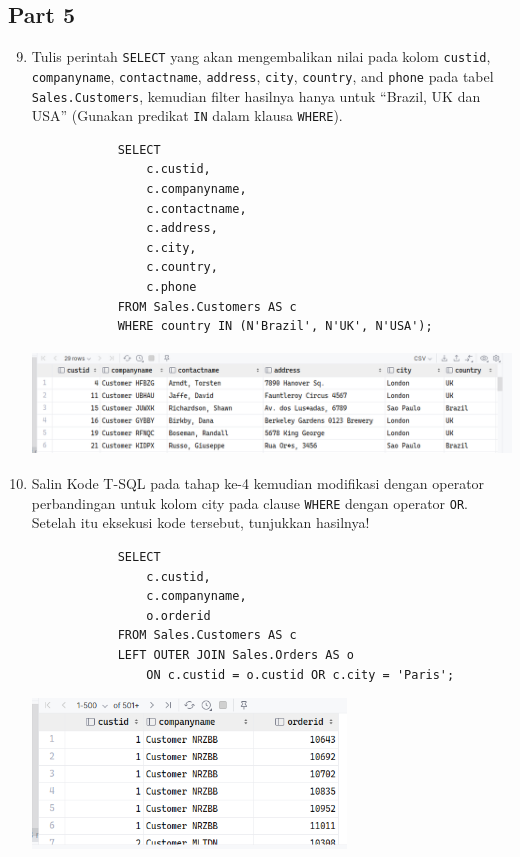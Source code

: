 \documentclass[12pt,titlepage]{article}
\begin{document}
\subsection{Part 5}
\begin{enumerate}
    \setcounter{enumi}{8}
    \item {
        Tulis perintah \texttt{SELECT} yang akan mengembalikan nilai pada kolom \texttt{custid}, \texttt{companyname},
        \texttt{contactname}, \texttt{address}, \texttt{city}, \texttt{country}, and \texttt{phone} pada tabel \texttt{Sales.Customers}, kemudian filter hasilnya
        hanya untuk ``Brazil, UK dan USA'' (Gunakan predikat \texttt{IN} dalam klausa \texttt{WHERE}).

        \begin{verbatim}
            SELECT
                c.custid,
                c.companyname,
                c.contactname,
                c.address,
                c.city,
                c.country,
                c.phone
            FROM Sales.Customers AS c
            WHERE country IN (N'Brazil', N'UK', N'USA');
        \end{verbatim}

        \begin{center}
            \includegraphics[height=2.8cm]{./images/p5-n1.png}
        \end{center}
    }
    \item {
        Salin Kode T-SQL pada tahap ke-4 kemudian modifikasi dengan operator perbandingan
        untuk kolom city pada clause \texttt{WHERE} dengan operator \texttt{OR}. Setelah itu eksekusi kode tersebut,
        tunjukkan hasilnya!

        \begin{verbatim}
            SELECT
                c.custid,
                c.companyname,
                o.orderid
            FROM Sales.Customers AS c
            LEFT OUTER JOIN Sales.Orders AS o 
                ON c.custid = o.custid OR c.city = 'Paris';
        \end{verbatim}

        \begin{center}
            \includegraphics[height=4cm]{./images/p5-n2.png}
        \end{center}
    }
\end{enumerate}
\end{document}
